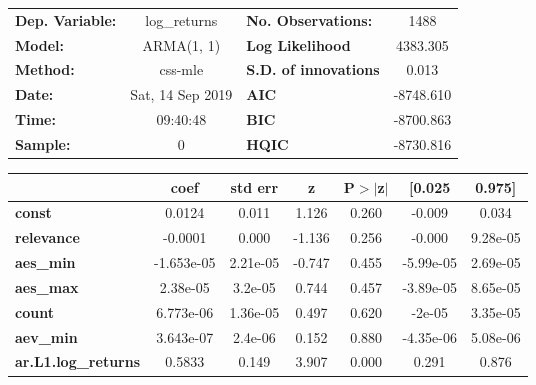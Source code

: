 \begin{center}
\begin{tabular}{lclc}
\toprule
\textbf{Dep. Variable:}     &        log\_returns       & \textbf{  No. Observations:  } &            1488            \\
\textbf{Model:}             &         ARMA(1, 1)        & \textbf{  Log Likelihood     } &          4383.305          \\
\textbf{Method:}            &          css-mle          & \textbf{  S.D. of innovations} &           0.013            \\
\textbf{Date:}              &      Sat, 14 Sep 2019     & \textbf{  AIC                } &         -8748.610          \\
\textbf{Time:}              &          09:40:48         & \textbf{  BIC                } &         -8700.863          \\
\textbf{Sample:}            &             0             & \textbf{  HQIC               } &         -8730.816          \\
\bottomrule
\end{tabular}
\begin{tabular}{lcccccc}
                            & \textbf{coef} & \textbf{std err} & \textbf{z} & \textbf{P$> |$z$|$} & \textbf{[0.025} & \textbf{0.975]}  \\
\midrule
\textbf{const}              &       0.0124  &        0.011     &     1.126  &         0.260        &       -0.009    &        0.034     \\
\textbf{relevance}          &      -0.0001  &        0.000     &    -1.136  &         0.256        &       -0.000    &     9.28e-05     \\
\textbf{aes\_min}           &   -1.653e-05  &     2.21e-05     &    -0.747  &         0.455        &    -5.99e-05    &     2.69e-05     \\
\textbf{aes\_max}           &     2.38e-05  &      3.2e-05     &     0.744  &         0.457        &    -3.89e-05    &     8.65e-05     \\
\textbf{count}              &    6.773e-06  &     1.36e-05     &     0.497  &         0.620        &       -2e-05    &     3.35e-05     \\
\textbf{aev\_min}           &    3.643e-07  &      2.4e-06     &     0.152  &         0.880        &    -4.35e-06    &     5.08e-06     \\
\textbf{ar.L1.log\_returns} &       0.5833  &        0.149     &     3.907  &         0.000        &        0.291    &        0.876     \\

\end{tabular}
\end{center}
